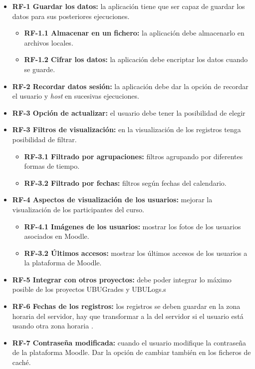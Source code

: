 \begin{itemize}
	

	\item \textbf{RF-1 Guardar los datos:} la aplicación tiene que ser capaz de guardar los datos para sus posteriores ejecuciones.
	\begin{itemize}
		\item \textbf{RF-1.1 Almacenar en un fichero:} la aplicación debe almacenarlo en archivos locales.
		\item \textbf{RF-1.2 Cifrar los datos:} la aplicación debe encriptar los datos cuando se guarde.
	\end{itemize}
	\item \textbf{RF-2 Recordar datos sesión:} la aplicación debe dar la opción de recordar el usuario y \textit{host} en sucesivas ejecuciones.
	\item \textbf{RF-3 Opción de actualizar:} el usuario debe tener la posibilidad de elegir 
	\item \textbf{RF-3 Filtros de visualización:} en la visualización de los registros tenga posibilidad de filtrar.
	\begin{itemize}
		\item \textbf{RF-3.1 Filtrado por agrupaciones:} filtros agrupando por diferentes formas de tiempo.
		\item \textbf{RF-3.2 Filtrado por fechas:} filtros según fechas del calendario.
	\end{itemize}
	\item \textbf{RF-4 Aspectos de visualización de los usuarios:} mejorar la visualización de los participantes del curso.
		\begin{itemize}
		\item \textbf{RF-4.1 Imágenes de los usuarios:} mostrar los fotos de los usuarios asociados en Moodle.
		\item \textbf{RF-3.2 Últimos accesos:} mostrar los últimos accesos de los usuarios a la plataforma de Moodle.
	\end{itemize}
	\item \textbf{RF-5 Integrar con otros proyectos:} debe poder integrar lo máximo posible de los proyectos UBUGrades y UBULogs.s
	\item \textbf{RF-6 Fechas de los registros:} los registros se deben guardar en la zona horaria del servidor, hay que transformar a la del servidor si el usuario está usando otra zona horaria .
	\item \textbf{RF-7 Contraseña modificada:} cuando el usuario modifique la contraseña de la plataforma Moodle. Dar la opción de cambiar también en los ficheros de caché.
	
\end{itemize}

